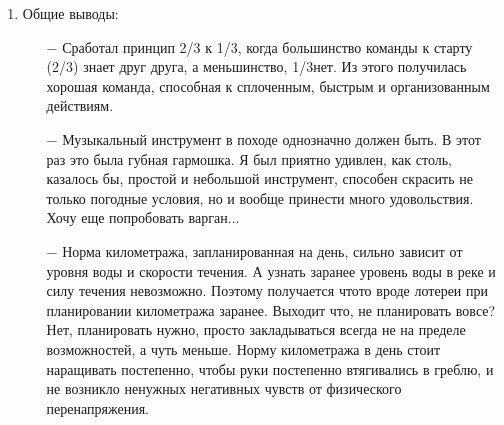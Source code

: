 \begin{enumerate}
\begin{enumerate}
		\item[$-$] Газовая плитка. Неоднозначная вещь, взятая с собой Димой. Один раз на ней мы приготовили плов и несколько раз вскипятили воды на чай. Имеет право на жизнь, места и веса много не занимает. Но тащить их несколько на 6 человек бессмысленно при таком мероприятии, как наше. Вероятнее всего, будет правильно сказать, что это такой своеобразный запасной вариант.
		\item[$-$] Панама оправдала себя лучше, чем кепки. Нос и уши не обгорают на ярком солнце, будучи прикрыты полями панамы. Харизматичная фетровая шляпа С.Ю. была вне конкуренции.
		\item[$-$] Сплавляться при чувствительной и ещё незагорелой коже лучше в х/б с длинным рукавом. У меня на такой случай есть то-о-оненький камуфляжный костюм, но пойдет и обычная х/б рубашка. Стало жарко\mdash закатал рукава. Чувствуешь, что поджаривает солнышко\mdash раскатал и намочил водой. 
		\item[$-$] Более плотная курточка с капюшоном а\sdash ля штормовка\mdash однозначно должна быть. Только, не синтетическая. Вообще, судьба синтетических тканей в походе печальна. Обычно они заканчивают в костре. Исключение составляет разве что флис.
		\item[$-$] Сапоги. В этот раз в них был Ваня и это простительно\mdash они ехали у него на байдарке и никому не мешали. Остальные были либо в шлепанцах, либо босиком, либо в химзащите. Моё предпочтение при прохладной воде, непогоде и просто нежелании мочить ноги\mdash за химзащитой по причине легкости, компактности и дешевизны.
	\end{enumerate}
\item Общие выводы:
	\begin{enumerate}
		\item[$-$] Сработал принцип 2/3 к 1/3, когда большинство команды к старту (2/3) знает друг друга, а меньшинство, 1/3\mdash нет. Из этого получилась хорошая команда, способная к сплоченным, быстрым и организованным действиям.
		\item[$-$] Музыкальный инструмент в походе однозначно должен быть. В этот раз это была губная гармошка. Я был приятно удивлен, как столь, казалось бы, простой и небольшой инструмент, способен скрасить не только погодные условия, но и вообще принести много удовольствия. Хочу еще попробовать варган$\ldots$
		\item[$-$] Норма километража, запланированная на день, сильно зависит от уровня воды и скорости течения. А узнать заранее уровень воды в реке и силу течения невозможно. Поэтому получается что\sdash то вроде лотереи при планировании километража заранее. Выходит что, не планировать вовсе? Нет, планировать нужно, просто закладываться всегда не на пределе возможностей, а чуть меньше. Норму километража в день стоит наращивать постепенно, чтобы руки постепенно втягивались в греблю, и не возникло ненужных негативных чувств от физического перенапряжения.

\end{enumerate}
\end{enumerate}
